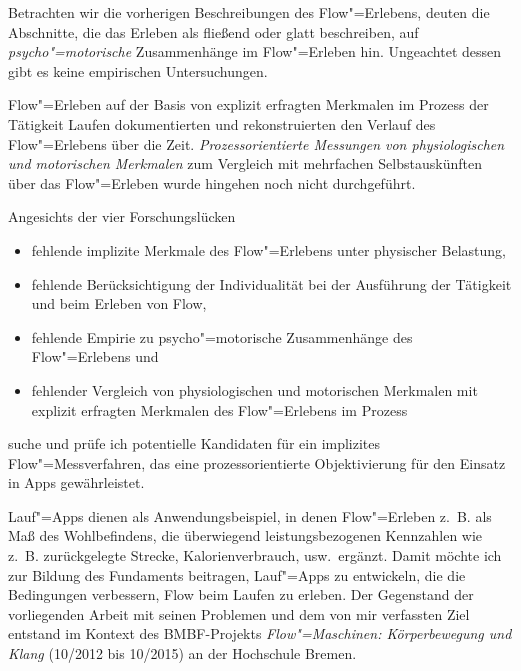 Betrachten wir die vorherigen Beschreibungen des Flow"=Erlebens, deuten die Abschnitte, die das Erleben als fließend oder glatt beschreiben, auf \emph{psycho"=motorische} Zusammenhänge im Flow"=Erleben hin. Ungeachtet dessen gibt es keine empirischen Untersuchungen.

Flow"=Erleben auf der Basis von explizit erfragten Merkmalen im Prozess der Tätigkeit Laufen dokumentierten \citet{Reinhardt2006, Schuler2009} und rekonstruierten den Verlauf des Flow"=Erlebens über die Zeit. \emph{Prozessorientierte Messungen von physiologischen und motorischen Merkmalen} zum Vergleich mit mehrfachen Selbstauskünften über das Flow"=Erleben wurde hingehen noch nicht durchgeführt.

Angesichts der vier Forschungslücken 
\begin{itemize}
	
	\item fehlende implizite Merkmale des Flow"=Erlebens unter physischer Belastung,
	
	\item fehlende Berücksichtigung der Individualität bei der Ausführung der Tätigkeit und beim Erleben von Flow,
	
	\item fehlende Empirie zu psycho"=motorische Zusammenhänge des Flow"=Erlebens und
	
	\item fehlender Vergleich von physiologischen und motorischen Merkmalen mit explizit erfragten Merkmalen des Flow"=Erlebens im Prozess 
\end{itemize}
suche und prüfe ich potentielle Kandidaten für ein implizites Flow"=Messverfahren, das eine prozessorientierte Objektivierung für den Einsatz in Apps gewährleistet. 

Lauf"=Apps dienen als Anwendungsbeispiel, in denen Flow"=Erleben z.~B. als Maß des Wohlbefindens, die überwiegend leistungsbezogenen Kennzahlen wie z.~B. zurückgelegte Strecke, Kalorienverbrauch, usw.\ ergänzt. Damit möchte ich zur Bildung des Fundaments beitragen, Lauf"=Apps zu entwickeln, die die Bedingungen verbessern, Flow beim Laufen zu erleben. Der Gegenstand der vorliegenden Arbeit mit seinen Problemen und dem von mir verfassten Ziel entstand im Kontext des \acs{BMBF}-Projekts \emph{Flow"=Maschinen: Körperbewegung und Klang} (10/2012 bis 10/2015) an der Hochschule Bremen.


